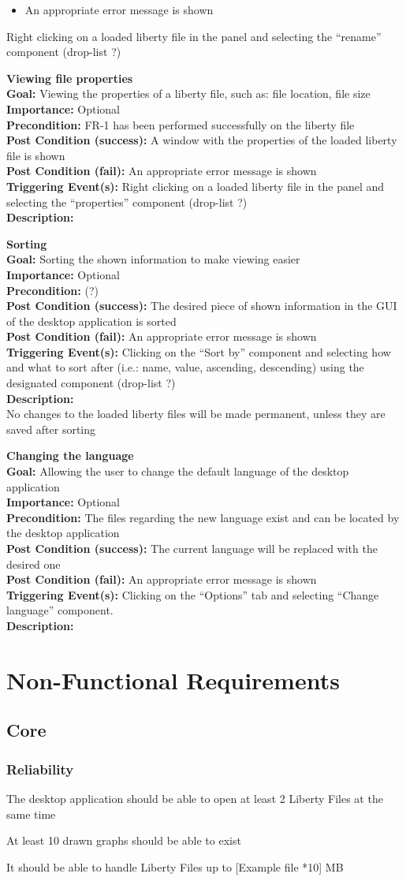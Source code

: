 \documentclass[10pt,a4paper]{report}
\newcommand{\FRODescription}[8]{
    \textbf{#1} \leavevmode \\
    \textbf{Goal: } #2 \leavevmode \\
    \textbf{Importance: } #3 \leavevmode \\
    \textbf{Precondition: } #4 \leavevmode \\
    \textbf{Post Condition (success): } #5 \leavevmode \\
    \textbf{Post Condition (fail): } #6 \leavevmode \\
    \textbf{Triggering Event(s): } #7 \leavevmode \\
    \textbf{Description: } \leavevmode \\
    #8}
\begin{document}
\begin{FRO}
{\begin{itemize}
        \item An appropriate error message is shown
    \end{itemize}}
    {Right clicking on a loaded liberty file in the panel and selecting the “rename” component (drop-list ?)}
    \item \FRODescription{Viewing file properties}
    {Viewing the properties of a liberty file, such as: file location, file size}
    {Optional}
    {FR-1 has been performed successfully on the liberty file}
    {A window with the properties of the loaded liberty file is shown}
    {An appropriate error message is shown}
    {Right clicking on a loaded liberty file in the panel and selecting the “properties” component (drop-list ?)}
    \item \FRODescription{Sorting}
    {Sorting the shown information to make viewing easier}
    {Optional}
    {(?)}
    {The desired piece of shown information in the GUI of the desktop application is sorted}
    {An appropriate error message is shown}
    {Clicking on the “Sort by” component and selecting how and what to sort after (i.e.: name, value, ascending, descending) using the designated component (drop-list ?)}
    {No changes to the loaded liberty files will be made permanent, unless they are saved after sorting}
    \item \FRODescription{Changing the language}
    {Allowing the user to change the default language of the desktop application}
    {Optional}
    {The files regarding the new language exist and can be located by the desktop application}
    {The current language will be replaced with the desired one}
    {An appropriate error message is shown}
    {Clicking on the “Options” tab and selecting “Change language” component.}
\end{FRO}

\section{Non-Functional Requirements}
\subsection{Core}
\subsubsection{Reliability}
\begin{NFR-Rel}
    \item The desktop application should be able to open at least 2 Liberty Files at the same time
    \item At least 10 drawn graphs should be able to exist
    \item It should be able to handle Liberty Files up to [Example file *10] MB
\end{NFR-Rel}
\end{document}

